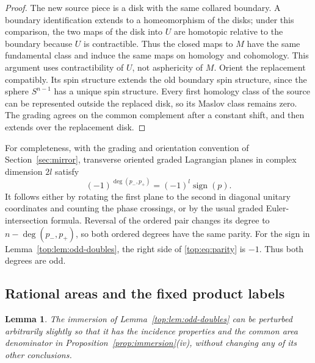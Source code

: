 \documentclass[11pt]{article}
\numberwithin{equation}{section}
\newtheorem{lemma}[theorem]{Lemma}
\theoremstyle{definition}
\theoremstyle{remark}
\begin{document}
\begin{proof}
The new source piece is a disk with the same collared
boundary.  A boundary identification extends to a
homeomorphism of the disks; under this comparison, the
two maps of the disk into $U$ are homotopic relative to
the boundary because $U$ is contractible.  Thus the
closed maps to $M$ have the same fundamental class and
induce the same maps on homology and cohomology.  This
argument uses contractibility of $U$, not asphericity of
$M$.  Orient the replacement compatibly.  Its spin
structure extends the old boundary spin structure,
since the sphere $S^{n-1}$ has a unique spin structure.
Every first homology class of the source can be
represented outside the replaced disk, so its Maslov
class remains zero.  The grading agrees on the common
complement after a constant shift, and then extends
over the replacement disk.
\end{proof}

For completeness, with the grading and orientation convention of
Section~\ref{sec:mirror}, transverse oriented graded Lagrangian
planes in complex dimension $2l$ satisfy
\begin{equation}\label{top:eq:parity}
       (-1)^{\deg(p_-,p_+)}=(-1)^l\operatorname{sign}(p).
\end{equation}
It follows either by rotating the first plane to the second in
diagonal unitary coordinates and counting the phase crossings,
or by the usual graded Euler-intersection formula.  Reversal of
the ordered pair changes its degree to $n-\deg(p_-,p_+)$,
so both ordered degrees have the same parity.  For the sign
in Lemma~\ref{top:lem:odd-doubles}, the right side of
\eqref{top:eq:parity} is $-1$.  Thus both degrees are odd.

\subsection{Rational areas and the fixed product labels}

\begin{lemma}\label{top:lem:rational-areas}
The immersion of Lemma~\ref{top:lem:odd-doubles} can be
perturbed arbitrarily slightly so that it has the incidence
properties and the common area denominator in
Proposition~\ref{prop:immersion}\textup{(iv)}, without changing
any of its other conclusions.
\end{lemma}
\end{document}
